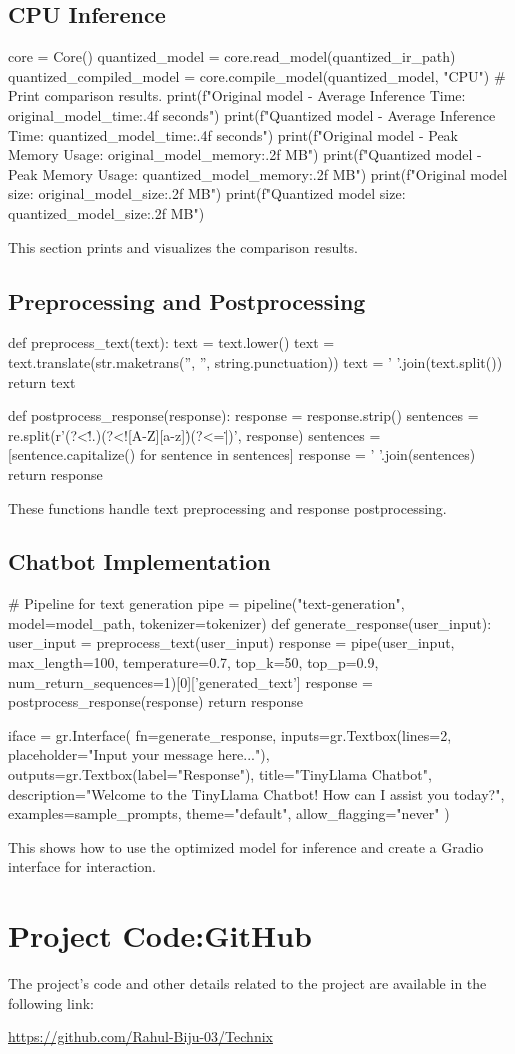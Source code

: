 \documentclass{josis}
\begin{document}
\subsection{CPU Inference}
\begin{python}
core = Core() 
quantized_model = core.read_model(quantized_ir_path)
quantized_compiled_model = core.compile_model(quantized_model, "CPU")
# Print comparison results.
print(f"Original model - Average Inference Time: {original_model_time:.4f} seconds")
print(f"Quantized model - Average Inference Time: {quantized_model_time:.4f} seconds")
print(f"Original model - Peak Memory Usage: {original_model_memory:.2f} MB")
print(f"Quantized model - Peak Memory Usage: {quantized_model_memory:.2f} MB")
print(f"Original model size: {original_model_size:.2f} MB")
print(f"Quantized model size: {quantized_model_size:.2f} MB")


\end{python}
This section prints and visualizes the comparison results.
\subsection{Preprocessing and Postprocessing}
\begin{python}
def preprocess_text(text):
    text = text.lower()
    text = text.translate(str.maketrans('', '', string.punctuation))
    text = ' '.join(text.split())
    return text

def postprocess_response(response):
    response = response.strip()
    sentences = re.split(r'(?<!\w\.\w.)(?<![A-Z][a-z]\.)(?<=\.|\?)\s', response)
    sentences = [sentence.capitalize() for sentence in sentences]
    response = ' '.join(sentences)
    return response
\end{python}
These functions handle text preprocessing and response postprocessing.
\subsection{Chatbot Implementation}
\begin{python}
# Pipeline for text generation
pipe = pipeline("text-generation", model=model_path, tokenizer=tokenizer)
def generate_response(user_input):
    user_input = preprocess_text(user_input)
    response = pipe(user_input, max_length=100, temperature=0.7, top_k=50, top_p=0.9, num_return_sequences=1)[0]['generated_text']
    response = postprocess_response(response)
    return response

iface = gr.Interface(
    fn=generate_response,
    inputs=gr.Textbox(lines=2, placeholder="Input your message here..."),
    outputs=gr.Textbox(label="Response"),
    title="TinyLlama Chatbot",
    description="Welcome to the TinyLlama Chatbot! How can I assist you today?",
    examples=sample_prompts,
    theme="default",
    allow_flagging="never"
)
\end{python}
This shows how to use the optimized model for inference and create a Gradio interface for interaction.


\section* {Project Code:GitHub}
The project's code and other details related to the project are available in the following link:

\href{https://github.com/Rahul-Biju-03/Technix}{https://github.com/Rahul-Biju-03/Technix}
\end{document}
